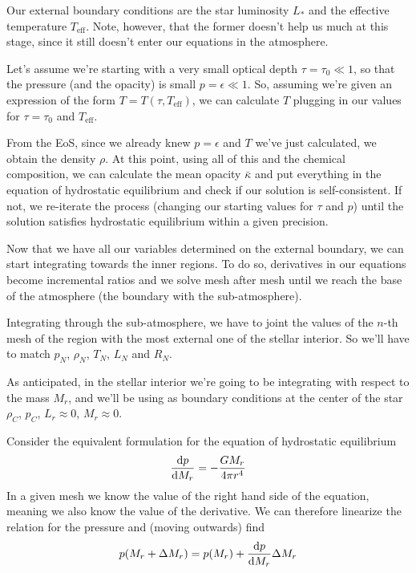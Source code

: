 Our external boundary conditions are the star luminosity $L_{*}$ and the effective temperature $T_{\text{eff}}$. Note, however, that the former doesn't help us much at this stage, since it still doesn't enter our equations in the atmosphere.
\par Let's assume we're starting with a very small optical depth $\tau = \tau_{0} \ll 1$, so that the pressure (and the opacity) is small $p = \epsilon \ll 1$. So, assuming we're given an expression of the form $T = T(\tau, T_{\text{eff}})$, we can calculate $T$ plugging in our values for $\tau = \tau_{0}$ and $T_{\text{eff}}$.
\par From the EoS, since we already knew $p = \epsilon$ and $T$ we've just calculated, we obtain the density $\rho$. At this point, using all of this and the chemical composition, we can calculate the mean opacity $\bar{\kappa}$ and put everything in the equation of hydrostatic equilibrium and check if our solution is self-consistent. If not, we re-iterate the process (changing our starting values for $\tau$ and $p$) until the solution satisfies hydrostatic equilibrium within a given precision.
\par Now that we have all our variables determined on the external boundary, we can start integrating towards the inner regions. To do so, derivatives in our equations become incremental ratios and we solve mesh after mesh until we reach the base of the atmosphere (the boundary with the sub-atmosphere).
\par Integrating through the sub-atmosphere, we have to joint the values of the $n$-th mesh of the region with the most external one of the stellar interior. So we'll have to match $p_{N}$, $\rho_{N}$, $T_{N}$, $L_{N}$ and $R_{N}$.
\par As anticipated, in the stellar interior we're going to be integrating with respect to the mass $M_{r}$, and we'll be using as boundary conditions at the center of the star $\rho_{C}$, $p_{C}$, $L_{r} \approx 0$, $M_{r}\approx 0$.
\par Consider the equivalent formulation for the equation of hydrostatic equilibrium
\begin{equation*}
    \frac{\text{d}p}{\text{d}M_{r}} = -\frac{GM_{r}}{4\pi r^{4}}
\end{equation*}
In a given mesh we know the value of the right hand side of the equation, meaning we also know the value of the derivative. We can therefore linearize the relation for the pressure and (moving outwards) find
\begin{equation*}
    p(M_{r}+\Delta M_{r}) = p(M_{r})+\frac{\text{d}p}{\text{d}M_{r}}\Delta M_{r}
\end{equation*}
